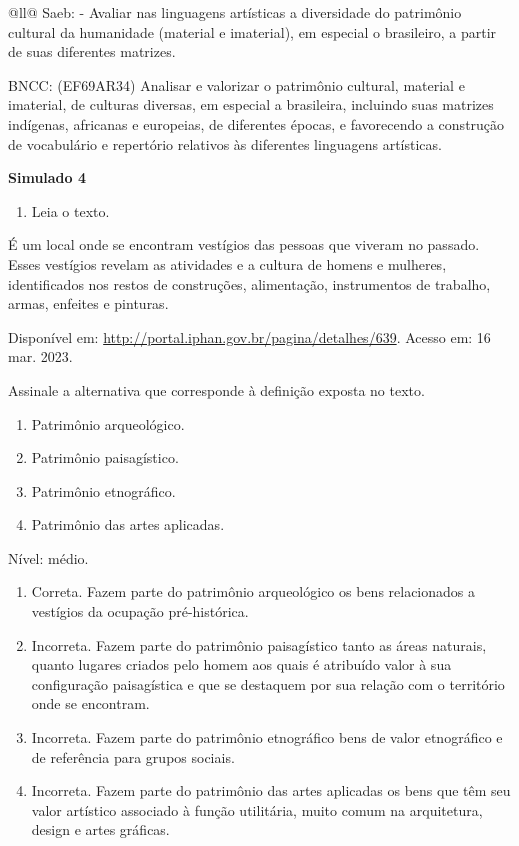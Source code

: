 \begin{itemize}
\begin{itemize}
\begin{escolha}[]{@{}ll@{}}
Saeb: - Avaliar nas linguagens artísticas a diversidade do patrimônio
cultural da humanidade (material e imaterial), em especial o brasileiro,
a partir de suas diferentes matrizes.

BNCC: (EF69AR34) Analisar e valorizar o patrimônio cultural, material e
imaterial, de culturas diversas, em especial a brasileira, incluindo
suas matrizes indígenas, africanas e europeias, de diferentes épocas, e
favorecendo a construção de vocabulário e repertório relativos às
diferentes linguagens artísticas.

\textbf{Simulado 4}

\begin{enumerate}
\def\labelenumi{\arabic{enumi}.}
\item
  Leia o texto.
\end{enumerate}

É um local onde se encontram vestígios das pessoas que viveram no
passado. Esses vestígios revelam as atividades e a cultura de homens e
mulheres, identificados nos restos de construções, alimentação,
instrumentos de trabalho, armas, enfeites e pinturas.~

Disponível em: \url{http://portal.iphan.gov.br/pagina/detalhes/639}.
Acesso em: 16 mar. 2023.

Assinale a alternativa que corresponde à definição exposta no texto.

\begin{enumerate}
\def\labelenumi{\alph{enumi}.}
\item
  Patrimônio arqueológico.
\item
  Patrimônio paisagístico.
\item
  Patrimônio etnográfico.
\item
  Patrimônio das artes aplicadas.
\end{enumerate}

Nível: médio.

\begin{enumerate}
\def\labelenumi{\alph{enumi}.}
\item
  Correta. Fazem parte do patrimônio arqueológico os bens relacionados a
  vestígios da ocupação pré-histórica.
\item
  Incorreta. Fazem parte do patrimônio paisagístico tanto as áreas
  naturais, quanto lugares criados pelo homem aos quais é atribuído
  valor à sua configuração paisagística e que se destaquem por sua
  relação com o território onde se encontram.
\item
  Incorreta. Fazem parte do patrimônio etnográfico bens de valor
  etnográfico e de referência para grupos sociais.
\item
  Incorreta. Fazem parte do patrimônio das artes aplicadas os bens que
  têm seu valor artístico associado à função utilitária, muito comum na
  arquitetura, design e artes gráficas.
\end{enumerate}


\end{escolha}
\end{itemize}
\end{itemize}
